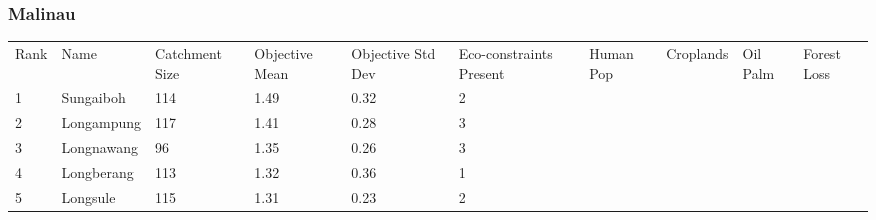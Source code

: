 \subsubsection{Malinau}
\begin{table}[ht]
\centering
\begingroup\fontsize{8pt}{9pt}\selectfont
\begin{tabular}{C{0.03\textwidth}C{0.12\textwidth}C{0.09\textwidth}C{0.08\textwidth}C{0.08\textwidth}C{0.08\textwidth}C{0.07\textwidth}C{0.07\textwidth}C{0.07\textwidth}C{0.07\textwidth}}
 Rank & Name & Catchment Size & Objective Mean & Objective Std Dev & Eco-constraints  Present & Human Pop & Croplands & Oil Palm & Forest Loss \\ 
 {1} & Sungaiboh & 114 & \textcolor[HTML]{FFFFFF}{1.49} & \textcolor[HTML]{FFFFFF}{0.32} & \textcolor[HTML]{000000}{2} &  &  &  &  \\ 
  {2} & Longampung & 117 & \textcolor[HTML]{FFFFFF}{1.41} & \textcolor[HTML]{000000}{0.28} & \textcolor[HTML]{FFFFFF}{3} &  &  &  &  \\ 
  {3} & Longnawang &  96 & \textcolor[HTML]{FFFFFF}{1.35} & \textcolor[HTML]{000000}{0.26} & \textcolor[HTML]{FFFFFF}{3} &  &  &  &  \\ 
  {4} & Longberang & 113 & \textcolor[HTML]{FFFFFF}{1.32} & \textcolor[HTML]{FFFFFF}{0.36} & \textcolor[HTML]{000000}{1} &  &  &  &  \\ 
  {5} & Longsule & 115 & \textcolor[HTML]{FFFFFF}{1.31} & \textcolor[HTML]{000000}{0.23} & \textcolor[HTML]{000000}{2} &  &  &  &  \\ 

\end{tabular}
\end{table}
